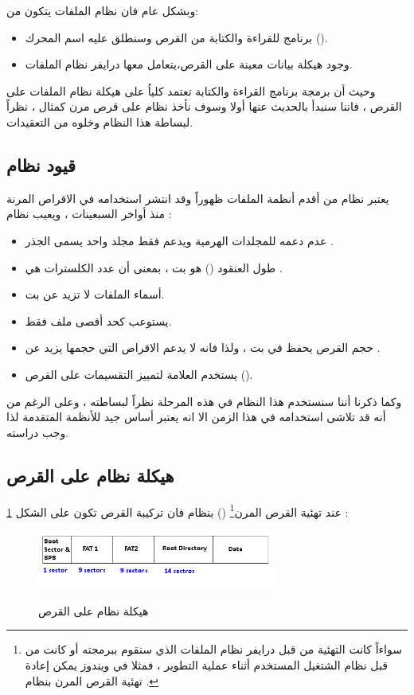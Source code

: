 \documentclass[document.tex]{subfiles}
\begin{document}
وبشكل عام فان نظام الملفات يتكون من:
\begin{itemize}
\item برنامج للقراءة والكتابة من القرص وسنطلق عليه اسم المحرك ().
\item وجود هيكلة بيانات  معينة على القرص،يتعامل معها درايفر نظام الملفات.

\end{itemize}  

وحيث أن برمجة برنامج القراءة والكتابة تعتمد كلياُ على هيكلة نظام الملفات على القرص ، فاننا سنبدأ بالحديث عنها أولا وسوف نأخذ نظام  على قرص مرن كمثال ، نظراً لبساطة هذا النظام وخلوه من التعقيدات.%

\subsection{قيود نظام }
يعتبر نظام  من أقدم أنظمة الملفات ظهوراً وقد انتشر استخدامه في الاقراص المرنة منذ أواخر السبعينات ، ويعيب نظام  :
\begin{itemize}
\item عدم دعمه للمجلدات الهرمية ويدعم فقط مجلد واحد يسمى الجذر .
\item طول العنقود () هو  بت ، بمعنى أن عدد الكلسترات هي .
\item أسماء الملفات لا تزيد عن  بت.
\item يستوعب كحد أقصى  ملف فقط.
\item حجم القرص يحفظ في  بت ، ولذا فانه لا يدعم الاقراص التي حجمها يزيد عن .
\item يستخدم العلامة  لتمييز التقسيمات على القرص ().


\end{itemize}

وكما ذكرنا أننا سنستخدم هذا النظام في هذه المرحلة نظراً لبساطته ، وعلى الرغم من أنه قد تلاشى استخدامه في هذا الزمن الا انه يعتبر أساس جيد للأنظمة المتقدمة لذا وجب دراسته.


\subsection{هيكلة نظام  على القرص}
عند تهئية القرص المرن\footnote{سواءاً كانت التهئية من قبل درايفر نظام الملفات الذي سنقوم ببرمجته أو كانت من قبل نظام الشتغيل المستخدم أثناء عملية التطوير ، فمثلا في ويندوز يمكن إعادة تهئية القرص المرن بنظام  .} () بنظام  فان تركيبة القرص تكون على الشكل \ref{fig:fat12structure} :\\
\begin{figure}[h!] 
  \caption{هيكلة نظام  على القرص}
  \centering
   \includegraphics[width=0.7\textwidth]{../img/fat12}
 \label{fig:fat12structure} 
\end{figure}
\end{document}
